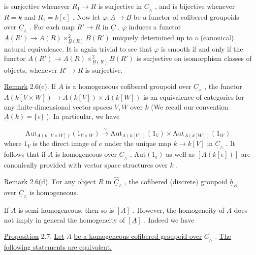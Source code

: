 
 is surjective whenever  $R_1 \longrightarrow R$  is surjective in  $\underline{C}_\wedge$ , and is bijective whenever  $R = k$  and  $R_1 = k[\epsilon]$ . Now let  $\varphi : \underline{A} \to \underline{B}$  be a functor of cofibered groupoids over  $\underline{C}_\wedge$ . For each map  $R' \to R$  in  $\underline{C}$  , $\varphi$  induces a functor $\underline{A}(R') \to \underline{A}(R) \times^2_{\underline{B}(R)} \underline{B}(R')$  uniquely determined up to a (canonical) natural equivalence. It is again trivial to see that  $\varphi$  is smooth if and only if the functor $A(R') \to \underline{A}(R) \times^2_{\underline{B}(R)} \underline{B}(R')$  is surjective on isomorphism classes of objects, whenever $R' \to R$  is surjective.


\underline{Remark} 2.6(c). If  $\underline{A}$  is a homogeneous cofibered groupoid over  $\underline{C}_\wedge$ , the functor $A(k[V \times W]) \to \underline{A}(k[V])\times \underline{A}(k[W])$         is an equivalence of categories for any finite-dimensional vector spaces  $V, W$  over  $k$  (We recall our convention $\underline{A}(k) = \{e\}$  ). In particular, we have

\begin{equation*}
\mathrm{Aut}_{\underline{A}(k[V\times W])}(1_{V\times W}) \xrightarrow{\ \sim\ } \mathrm{Aut}_{\underline{A}(k[V])}(1_V)\times\mathrm{Aut}_{\underline{A}(k[W])}(1_W)
\end{equation*}
where  $1_V$  is the direct image of  $e$  under the unique map  $k \to k[V]$  in  $\underline{C}_\wedge$  . It follows that if  $\underline{A}$  is homogeneous over  $\underline{C}_\wedge$ , $\mathrm{Aut}(1_\epsilon)$  as well as  $[\underline{A}(k[\epsilon])]$ are canonically provided with vector space structures over  $k$  .


\underline{Remark} 2.6(d). For any object  $R$  in  $\hat{\underline{C}}_\wedge$ , the cofibered (discrete) groupoid $\underline{h}_R$  over  $\underline{C}_\wedge$  is homogeneous.

If  $\underline{A}$  is semi-homogeneous, then so is  $[\underline{A}]$ . However, the homogeneity of  $\underline{A}$  does not imply in general the homogeneity of  $[\underline{A}]$ . Indeed we have


\underline{Proposition} 2.7.  \underline{Let}  $\underline{A}$  \underline{be a homogeneous cofibered groupoid over}  $\underline{C}_\wedge$ . \underline{The following statements are equivalent.}

